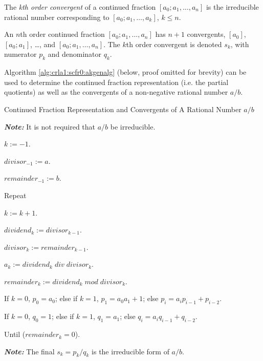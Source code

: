 The \emph{kth order convergent} of a
continued fraction $[a_0; a_1, \ldots{}, a_n]$ is the irreducible rational
number corresponding to $[a_0; a_1, \ldots{}, a_k]$, $k \leq n$.

An $n$th order continued fraction $[a_0; a_1, \ldots{}, a_n]$ has $n+1$
convergents, $[a_0]$, $[a_0; a_1]$, \ldots{}, and $[a_0; a_1, \ldots{},
a_n]$.  The $k$th order convergent is denoted $s_k$, with numerator $p_k$
and denominator $q_k$.

Algorithm \ref{alg:crla1:scfr0:akgenalg} (below, proof omitted for
brevity) can be used to determine the continued fraction representation
(i.e.  the partial quotients) as well as the convergents of a non-negative
rational number $a/b$\@.

\begin{vworkalgorithmstatementpar}{Continued Fraction Representation and
                                   Convergents of
                                   A Rational Number \mbox{\boldmath $a/b$}}
\label{alg:crla1:scfr0:akgenalg}

\textbf{\emph{Note:}} It is not required that $a/b$ be irreducible.

\begin{alglvl0}
\item $k:=-1$.
\item $divisor_{-1} := a$.
\item $remainder_{-1} := b$.

\item Repeat

\begin{alglvl1}
\item $k := k + 1$.
\item $dividend_k := divisor_{k-1}$.
\item $divisor_k  := remainder_{k-1}$.
\item $a_k :=  dividend_k \; div \; divisor_k$.
\item $remainder_k := dividend_k \; mod \; divisor_k$.
\item If $k=0$, $p_0 = a_0$; else if $k=1$, $p_1 = a_0 a_1 + 1$;
      else $p_i = a_i p_{i-1} + p_{i-2}$.
\item If $k=0$, $q_0 = 1$; else if $k=1$, $q_1 = a_1$;
      else $q_i = a_i q_{i-1} + q_{i-2}$.
\end{alglvl1}

\item Until ($remainder_k = 0$).
\end{alglvl0}
\textbf{\emph{Note:}} The final $s_k = p_k / q_k$ is the irreducible
form of $a/b$.
\end{vworkalgorithmstatementpar}
\vworkalgorithmfooter{}

